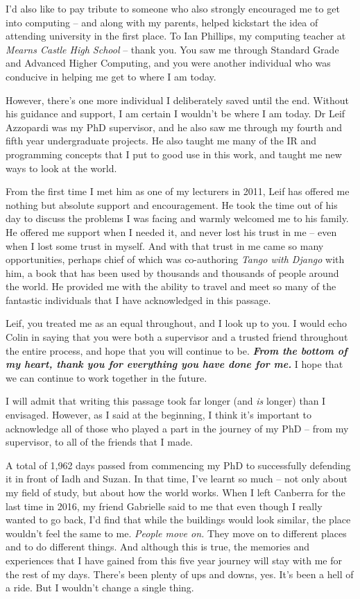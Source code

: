 \begin{preamble}
I'd also like to pay tribute to someone who also strongly encouraged me to get into computing -- and along with my parents, helped kickstart the idea of attending university in the first place. To Ian Phillips, my computing teacher at \emph{Mearns Castle High School} -- thank you. You saw me through Standard Grade and Advanced Higher Computing, and you were another individual who was conducive in helping me get to where I am today.

However, there's one more individual I deliberately saved until the end. Without his guidance and support, I am certain I wouldn't be where I am today. Dr Leif Azzopardi was my PhD supervisor, and he also saw me through my fourth and fifth year undergraduate projects. He also taught me many of the IR and programming concepts that I put to good use in this work, and taught me new ways to look at the world.

From the first time I met him as one of my lecturers in 2011, Leif has offered me nothing but absolute support and encouragement. He took the time out of his day to discuss the problems I was facing and warmly welcomed me to his family. He offered me support when I needed it, and never lost his trust in me -- even when I lost some trust in myself. And with that trust in me came so many opportunities, perhaps chief of which was co-authoring \emph{Tango with Django} with him, a book that has been used by thousands and thousands of people around the world. He provided me with the ability to travel and meet so many of the fantastic individuals that I have acknowledged in this passage.

Leif, you treated me as an equal throughout, and I look up to you. I would echo Colin in saying that you were both a supervisor and a trusted friend throughout the entire process, and hope that you will continue to be. \textbf{\emph{From the bottom of my heart, thank you for everything you have done for me.}} I hope that we can continue to work together in the future.

\vspace*{4mm}
\acksep

I will admit that writing this passage took far longer (and \emph{is} longer) than I envisaged. However, as I said at the beginning, I think it's important to acknowledge all of those who played a part in the journey of my PhD -- from my supervisor, to all of the friends that I made.

A total of 1,962 days passed from commencing my PhD to successfully defending it in front of Iadh and Suzan. In that time, I've learnt so much -- not only about my field of study, but about how the world works. When I left Canberra for the last time in 2016, my friend Gabrielle said to me that even though I really wanted to go back, I'd find that while the buildings would look similar, the place wouldn't feel the same to me. \emph{People move on.} They move on to different places and to do different things. And although this is true, the memories and experiences that I have gained from this five year journey will stay with me for the rest of my days. There's been plenty of ups and downs, yes. It's been a hell of a ride. But I wouldn't change a single thing.


\end{preamble}

